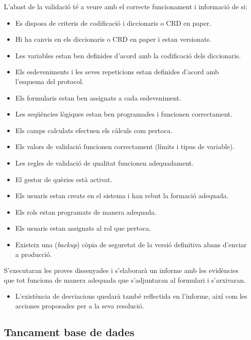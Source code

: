 \documentclass[
]{article}
\providecommand{\tightlist}{%
  \setlength{\itemsep}{0pt}\setlength{\parskip}{0pt}}
\begin{document}
L'abast de la validació té a veure amb el correcte funcionament i informació de si:

\begin{itemize}
\tightlist
\item
  Es disposa de criteris de codificació i diccionaris o CRD en paper.
\item
  Hi ha canvis en els diccionaris o CRD en paper i estan versionats.
\item
  Les variables estan ben definides d'acord amb la codificació dels diccionaris.
\item
  Els esdeveniments i les seves repeticions estan definides d'acord amb l'esquema del protocol.
\item
  Els formularis estan ben assignats a cada esdeveniment.
\item
  Les seqüències lògiques estan ben programades i funcionen correctament.
\item
  Els camps calculats efectuen els càlculs com pertoca.
\item
  Els valors de validació funcionen correctament (límits i tipus de variable).
\item
  Les regles de validació de qualitat funcionen adequadament.
\item
  El gestor de quèries està activat.
\item
  Els usuaris estan creats en el sistema i han rebut la formació adequada.
\item
  Els rols estan programats de manera adequada.
\item
  Els usuaris estan assignats al rol que pertoca.
\item
  Existeix una (\emph{backup}) còpia de seguretat de la versió definitiva abans d'enviar a producció.
\end{itemize}

S'executaran les proves dissenyades i s'elaborarà un informe amb les evidències que tot funciona de manera adequada que s'adjuntaran al formulari i s'arxivaran.

\begin{itemize}
\tightlist
\item
  L'existència de desviacions quedarà també reflectida en l'informe, així com les acciones proposades per a la seva resolució.
\end{itemize}

\hypertarget{tancament-base-de-dades}{%
\subsection{\texorpdfstring{\textbf{Tancament base de dades}}{Tancament base de dades}}\label{tancament-base-de-dades}}
\end{document}
